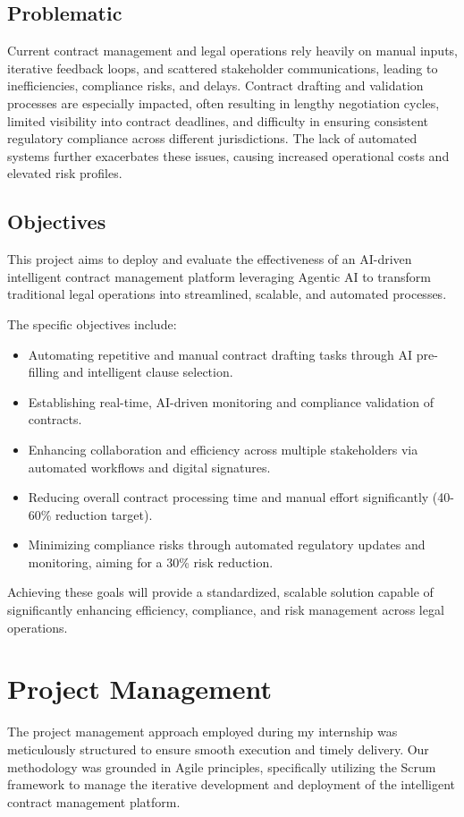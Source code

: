 \subsection{Problematic}
Current contract management and legal operations rely heavily on manual inputs, iterative feedback loops, and scattered stakeholder communications, leading to inefficiencies, compliance risks, and delays. Contract drafting and validation processes are especially impacted, often resulting in lengthy negotiation cycles, limited visibility into contract deadlines, and difficulty in ensuring consistent regulatory compliance across different jurisdictions. The lack of automated systems further exacerbates these issues, causing increased operational costs and elevated risk profiles.

\subsection{Objectives}
This project aims to deploy and evaluate the effectiveness of an AI-driven intelligent contract management platform leveraging Agentic AI to transform traditional legal operations into streamlined, scalable, and automated processes.\mynewline

The specific objectives include:
\begin{itemize}
    \item Automating repetitive and manual contract drafting tasks through AI pre-filling and intelligent clause selection.
    \item Establishing real-time, AI-driven monitoring and compliance validation of contracts.
    \item Enhancing collaboration and efficiency across multiple stakeholders via automated workflows and digital signatures.
    \item Reducing overall contract processing time and manual effort significantly (40-60\% reduction target).
    \item Minimizing compliance risks through automated regulatory updates and monitoring, aiming for a 30\% risk reduction.
\end{itemize}

Achieving these goals will provide a standardized, scalable solution capable of significantly enhancing efficiency, compliance, and risk management across legal operations.

\section{Project Management}
The project management approach employed during my internship was meticulously structured to ensure smooth execution and timely delivery. Our methodology was grounded in Agile principles, specifically utilizing the Scrum framework to manage the iterative development and deployment of the intelligent contract management platform.

